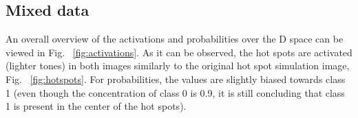 \documentclass{article}
\begin{document}
\subsection{Mixed data}

An overall overview of the activations and probabilities over the D space can be viewed in Fig. ~\ref{fig:activations}. As it can be observed, the hot spots are activated (lighter tones) in both images similarly to the original hot spot simulation image, Fig. ~\ref{fig:hotspots}. For probabilities, the values are slightly biased towards class 1 (even though the concentration of class 0 is 0.9, it is still concluding that class 1 is present in the center of the hot spots). %
\end{document}
